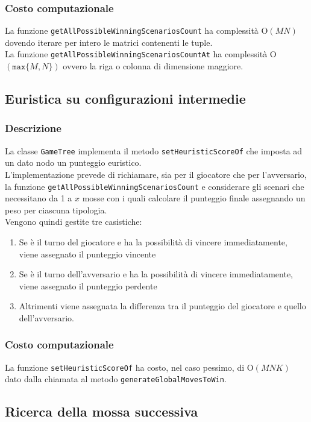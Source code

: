 \documentclass[11pt]{article}
\begin{document}
\subsubsection*{Costo computazionale}
La funzione \texttt{getAllPossibleWinningScenariosCount} ha complessità O$(MN)$ dovendo iterare per intero le matrici contenenti le tuple.\\
La funzione \texttt{getAllPossibleWinningScenariosCountAt} ha complessità O$(\texttt{max}\{M, N\})$ ovvero la riga o colonna di dimensione maggiore.

\subsection*{Euristica su configurazioni intermedie}
\subsubsection*{Descrizione}
La classe \texttt{GameTree} implementa il metodo \texttt{setHeuristicScoreOf} che imposta ad un dato nodo un punteggio euristico.\\
L'implementazione prevede di richiamare, sia per il giocatore che per l'avversario, la funzione \texttt{getAllPossibleWinningScenariosCount} e considerare gli scenari che necessitano da 1 a $x$ mosse con i quali calcolare il punteggio finale assegnando un peso per ciascuna tipologia.\\
Vengono quindi gestite tre casistiche: 
\begin{enumerate}
\setlength\itemsep{0.05cm}
	\item Se è il turno del giocatore e ha la possibilità di vincere immediatamente, viene assegnato il punteggio vincente
	\item Se è il turno dell'avversario e ha la possibilità di vincere immediatamente, viene assegnato il punteggio perdente
	\item Altrimenti viene assegnata la differenza tra il punteggio del giocatore e quello dell'avversario.
\end{enumerate}
\subsubsection*{Costo computazionale}
La funzione \texttt{setHeuristicScoreOf} ha costo, nel caso pessimo, di O$(MNK)$ dato dalla chiamata al metodo \texttt{generateGlobalMovesToWin}.

\newpage

\subsection*{Ricerca della mossa successiva}
\end{document}
